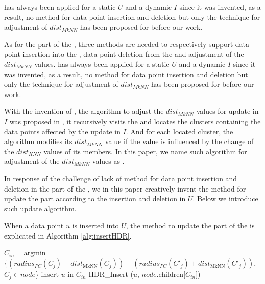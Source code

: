 \hdrtree has always been applied for a static $U$ and a dynamic $I$ since it was invented, as a result, no method for data point insertion and deletion but only the technique for adjustment of $dist_{MkNN}$ has been proposed for \hdrtree before our work.



As for the \hdrtree part of the \dualtree, three methods are needed to respectively support data point insertion into the \hdrtree, data point deletion from the \hdrtree and adjustment of the $dist_{MkNN}$ values. \hdrtree has always been applied for a static $U$ and a dynamic $I$ since it was invented, as a result, no method for data point insertion and deletion but only the technique for adjustment of $dist_{MkNN}$ has been proposed for \hdrtree before our work.

With the invention of \hdrtree, the algorithm to adjust the $dist_{MkNN}$ values for update in $I$ was proposed in \cite{yang2014continuous}, it recursively visits the \hdrtree and locates the clusters containing the data points affected by the update in $I$. And for each located cluster, the algorithm modifies its $dist_{MkNN}$ value if the value is influenced by the change of the $dist_{KNN}$ values of its members. In this paper, we name such algorithm for adjustment of the $dist_{MkNN}$ values as . 

In response of the challenge of lack of method for data point insertion and deletion in the \hdrtree part of the \dualtree, we in this paper creatively invent the method for update the \hdrtree part according to the insertion and deletion in $U$. Below we introduce such update algorithm.



When a data point $u$ is inserted into $U$, the method  to update the \hdrtree part of the \dualtree is explicated in Algorithm \ref{alg:insertHDR}.



\begin{algorithm}[t]
\caption{HDR\_Insert ($u$, $node$)}\label{alg:insertHDR}
{
    $C_{in}=$argmin$\{(radius_{PC}(C_{j})+dist_\text{MkNN}(C_{j}))-(radius_{PC}(C'_{j})+dist_\text{MkNN}(C'_{j}))$, $C_{j}\in node$\}\;
    insert $u$ in $C_{in}$\;
    HDR\_Insert ($u$, $node$.children[$C_{in}$])\;
}
\end{algorithm}


